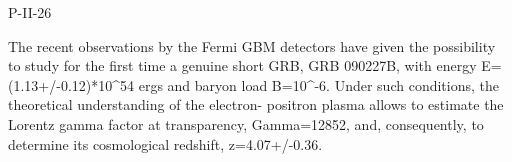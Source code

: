 P-II-26


\bigskip



\bigskip

\noindent The recent observations by the Fermi GBM detectors have given the possibility to study for
the first time a genuine short GRB, GRB 090227B, with energy E=(1.13+/-0.12)*10^54 ergs and
baryon load B=10^{-6}. Under such conditions, the theoretical understanding of the electron-
positron plasma allows to estimate the Lorentz gamma factor at transparency, Gamma=12852, and, consequently, to determine its cosmological redshift, z=4.07+/-0.36.
